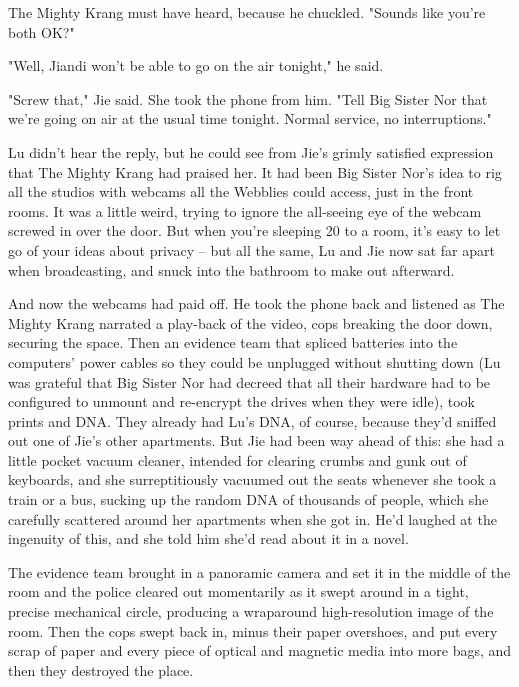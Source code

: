 The Mighty Krang must have heard, because he chuckled. "Sounds like
you're both OK?"

"Well, Jiandi won't be able to go on the air tonight," he said.

"Screw that," Jie said. She took the phone from him. "Tell Big
Sister Nor that we're going on air at the usual time tonight.
Normal service, no interruptions."

Lu didn't hear the reply, but he could see from Jie's grimly
satisfied expression that The Mighty Krang had praised her. It had
been Big Sister Nor's idea to rig all the studios with webcams all
the Webblies could access, just in the front rooms. It was a little
weird, trying to ignore the all-seeing eye of the webcam screwed in
over the door. But when you're sleeping 20 to a room, it's easy to
let go of your ideas about privacy -- but all the same, Lu and Jie
now sat far apart when broadcasting, and snuck into the bathroom to
make out afterward.

And now the webcams had paid off. He took the phone back and
listened as The Mighty Krang narrated a play-back of the video,
cops breaking the door down, securing the space. Then an evidence
team that spliced batteries into the computers' power cables so
they could be unplugged without shutting down (Lu was grateful that
Big Sister Nor had decreed that all their hardware had to be
configured to unmount and re-encrypt the drives when they were
idle), took prints and DNA. They already had Lu's DNA, of course,
because they'd sniffed out one of Jie's other apartments. But Jie
had been way ahead of this: she had a little pocket vacuum cleaner,
intended for clearing crumbs and gunk out of keyboards, and she
surreptitiously vacuumed out the seats whenever she took a train or
a bus, sucking up the random DNA of thousands of people, which she
carefully scattered around her apartments when she got in. He'd
laughed at the ingenuity of this, and she told him she'd read about
it in a novel.

The evidence team brought in a panoramic camera and set it in the
middle of the room and the police cleared out momentarily as it
swept around in a tight, precise mechanical circle, producing a
wraparound high-resolution image of the room. Then the cops swept
back in, minus their paper overshoes, and put every scrap of paper
and every piece of optical and magnetic media into more bags, and
then they destroyed the place.

